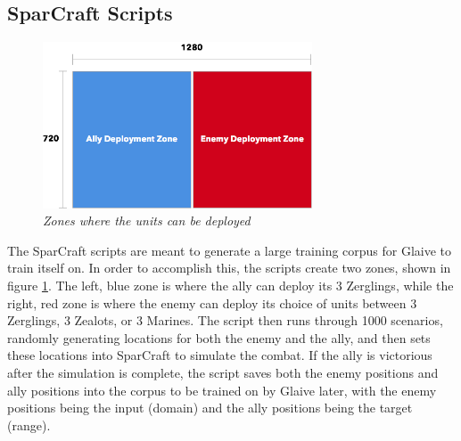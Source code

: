 \documentclass[twocolumn]{article}
\begin{document}
\subsection{SparCraft Scripts}
\begin{figure}[ht]
	\begin{center}
		\includegraphics[width=8cm]{deploymentZones.png}
	\end{center}
	\caption{\textit{Zones where the units can be deployed}}
	\label{fig:zones}
\end{figure}
The SparCraft scripts are meant to generate a large training corpus for Glaive to train itself on. In order to accomplish this, the scripts create two zones, shown in figure \ref{fig:zones}. The left, blue zone is where the ally can deploy its 3 Zerglings, while the right, red zone is where the enemy can deploy its choice of units between 3 Zerglings, 3 Zealots, or 3 Marines. The script then runs through 1000 scenarios, randomly generating locations for both the enemy and the ally, and then sets these locations into SparCraft to simulate the combat. If the ally is victorious after the simulation is complete, the script saves both the enemy positions and ally positions into the corpus to be trained on by Glaive later, with the enemy positions being the input (domain) and the ally positions being the target (range).
\end{document}
